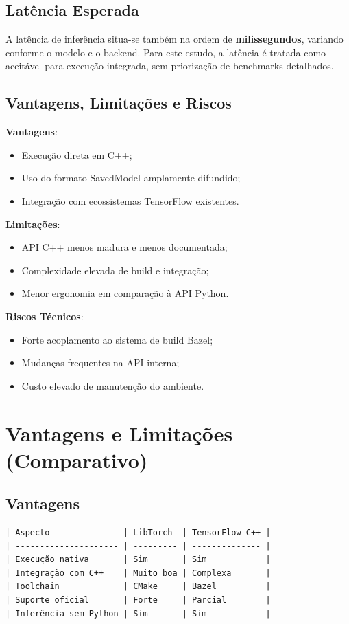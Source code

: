 \subsection{Latência Esperada}

A latência de inferência situa-se também na ordem de \textbf{milissegundos}, variando
conforme o modelo e o backend. Para este estudo, a latência é tratada como aceitável
para execução integrada, sem priorização de benchmarks detalhados.


\subsection{Vantagens, Limitações e Riscos}

\textbf{Vantagens}:
\begin{itemize}
    \item Execução direta em C++;
    \item Uso do formato SavedModel amplamente difundido;
    \item Integração com ecossistemas TensorFlow existentes.
\end{itemize}

\textbf{Limitações}:
\begin{itemize}
    \item API C++ menos madura e menos documentada;
    \item Complexidade elevada de build e integração;
    \item Menor ergonomia em comparação à API Python.
\end{itemize}

\textbf{Riscos Técnicos}:
\begin{itemize}
    \item Forte acoplamento ao sistema de build Bazel;
    \item Mudanças frequentes na API interna;
    \item Custo elevado de manutenção do ambiente.
\end{itemize}

\section{Vantagens e Limitações (Comparativo)}

\subsection{Vantagens}
\begin{verbatim}
| Aspecto               | LibTorch  | TensorFlow C++ |
| --------------------- | --------- | -------------- |
| Execução nativa       | Sim       | Sim            |
| Integração com C++    | Muito boa | Complexa       |
| Toolchain             | CMake     | Bazel          |
| Suporte oficial       | Forte     | Parcial        |
| Inferência sem Python | Sim       | Sim            |

\end{verbatim}

